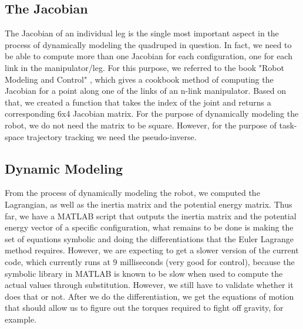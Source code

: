 \subsection{The Jacobian}
The Jacobian of an individual leg is the single most important aspect in the process of dynamically modeling the quadruped in question. In fact, we need to be able to compute more than one Jacobian for each configuration, one for each link in the manipulator/leg.
For this purpose, we referred to the book "Robot Modeling and Control" \cite{spong2006robot}, which gives a cookbook method of computing the Jacobian for a point along one of the links of an n-link manipulator. Based on that, we created a function that takes the index of the joint and returns a corresponding 6x4 Jacobian matrix. For the purpose of dynamically modeling the robot, we do not need the matrix to be square. However, for the purpose of task-space trajectory tracking we need the pseudo-inverse.

\subsection{Dynamic Modeling}
From the process of dynamically modeling the robot, we computed the Lagrangian, as well as the inertia matrix and the potential energy matrix.
Thus far, we have a MATLAB script that outputs the inertia matrix and the potential energy vector of a specific configuration, what remains to be done is making the set of equations symbolic and doing the differentiations that the Euler Lagrange method requires.
However, we are expecting to get a slower version of the current code, which currently runs at 9 milliseconds (very good for control), because the symbolic library in MATLAB is known to be slow when used to compute the actual values through substitution. However, we still have to validate whether it does that or not.
After we do the differentiation, we get the equations of motion that should allow us to figure out the torques required to fight off gravity, for example.
